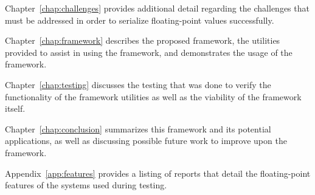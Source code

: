 Chapter~\ref{chap:challenges} provides additional detail regarding the challenges that must be addressed in order to serialize floating-point values successfully.

Chapter~\ref{chap:framework} describes the proposed framework, the utilities provided to assist in using the framework, and demonstrates the usage of the framework.

Chapter~\ref{chap:testing} discusses the testing that was done to verify the functionality of the framework utilities as well as the viability of the framework itself.

Chapter~\ref{chap:conclusion} summarizes this framework and its potential applications, as well as discussing possible future work to improve upon the framework.

Appendix~\ref{app:features} provides a listing of reports that detail the floating-point features of the systems used during testing.
